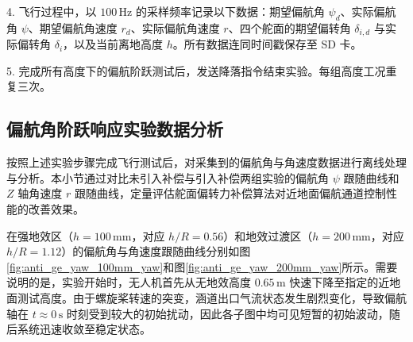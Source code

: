 4. 飞行过程中，以 \(100\,\mathrm{Hz}\) 的采样频率记录以下数据：期望偏航角 \(\psi_d\)、实际偏航角 \(\psi\)、期望偏航角速度 \(r_d\)、实际偏航角速度 \(r\)、四个舵面的期望偏转角 \(\delta_{i,d}\) 与实际偏转角 \(\delta_i\)，以及当前离地高度 \(h\)。所有数据连同时间戳保存至 SD 卡。

5. 完成所有高度下的偏航阶跃测试后，发送降落指令结束实验。每组高度工况重复三次。

\subsection{偏航角阶跃响应实验数据分析}
按照上述实验步骤完成飞行测试后，对采集到的偏航角与角速度数据进行离线处理与分析。本小节通过对比未引入补偿与引入补偿两组实验的偏航角 \(\psi\) 跟随曲线和 \(Z\) 轴角速度 \(r\) 跟随曲线，定量评估舵面偏转力补偿算法对近地面偏航通道控制性能的改善效果。

在强地效区（\(h = 100\,\mathrm{mm}\)，对应 \(h/R = 0.56\)）和地效过渡区（\(h = 200\,\mathrm{mm}\)，对应 \(h/R = 1.12\)）的偏航角与角速度跟随曲线分别如图\ref{fig:anti_ge_yaw_100mm_yaw}和图\ref{fig:anti_ge_yaw_200mm_yaw}所示。需要说明的是，实验开始时，无人机首先从无地效高度 \(0.65\,\mathrm{m}\) 快速下降至指定的近地面测试高度。由于螺旋桨转速的突变，涵道出口气流状态发生剧烈变化，导致偏航轴在 \(t \approx 0\,\mathrm{s}\) 时刻受到较大的初始扰动，因此各子图中均可见短暂的初始波动，随后系统迅速收敛至稳定状态。



